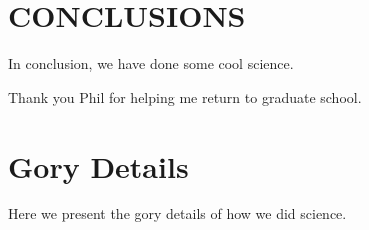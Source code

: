 \documentclass[twocolumn, twocolappendix, numberedappendix, linenumbers]{aastex631}
\begin{document}
\section{CONCLUSIONS}

In conclusion, we have done some cool science.

\begin{acknowledgments}
Thank you Phil for helping me return to graduate school.
\end{acknowledgments}

\vspace{5mm}

\appendix
\section{Gory Details}

Here we present the gory details of how we did science.



\end{document}
